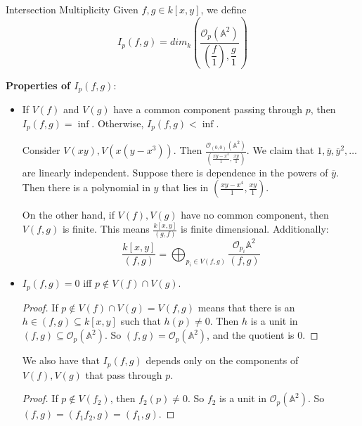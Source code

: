 \documentclass{report}
\begin{document}
\begin{definition}{Intersection Multiplicity}
    Given $f, g \in k[x, y]$, we define 
        \begin{equation*}
            I_{p}(f, g) = dim_{k}\left(\dfrac{\mathcal{O}_{p}(\mathbb{A}^{2})}{(\dfrac{f}{1}), \dfrac{g}{1}}\right)
        \end{equation*}
\end{definition}

\textbf{Properties of $I_{p}(f, g)$}:
    \begin{itemize}
        \item If $V(f)$ and $V(g)$ have a common component passing through $p$, then $I_{p}(f, g) = \inf$. Otherwise, $I_{p}(f, g) < \inf$.
            \begin{examples}
                \begin{example}
                    Consider $V(xy), V(x(y - x^{3}))$. Then $\frac{\mathcal{O}_{(0, 0)}(\mathbb{A}^{2})}{(\frac{xy - x^{4}}{1}, \frac{xy}{1})}$. We claim that $1, \overline{y}, \overline{y}^{2}, \ldots $ are linearly independent. Suppose there is dependence in the powers of $\overline{y}$. Then there is a polynomial in $y$ that lies in $(\frac{xy - x^{4}}{1}, \frac{xy}{1})$.

                    On the other hand, if $V(f), V(g)$ have no common component, then $V(f, g)$ is finite. This means $\frac{k[x, y]}{(g, f)}$ is finite dimensional. Additionally:
                        \begin{equation*}
                            \dfrac{k[x, y]}{(f, g)} = \bigoplus_{p_{i} \in V(f, g)} \dfrac{\mathcal{O}_{p_{i}}\mathbb{A}^{2}}{(f, g)}
                        \end{equation*}
                \end{example}
            \end{examples}

        \item $I_{p}(f, g) = 0$ iff $p \notin V(f) \cap V(g)$. 
            \begin{proof}
                If $p \notin V(f) \cap V(g) = V(f, g)$ means that there is an $h \in (f, g) \subseteq k[x, y]$ such that $h(p) \neq 0$. Then $h$ is a unit in $(f, g) \subseteq \mathcal{O}_{p}(\mathbb{A}^{2})$. So $(f, g) = \mathcal{O}_{p}(\mathbb{A}^{2})$, and the quotient is $0$.
            \end{proof}

            We also have that $I_{p}(f, g)$ depends only on the components of $V(f), V(g)$ that pass through $p$.
                \begin{proof}
                    If $p \notin V(f_{2})$, then $f_{2}(p) \neq 0$. So $f_{2}$ is a unit in $\mathcal{O}_{p}(\mathbb{A}^{2})$. So $(f, g) = (f_{1}f_{2}, g) = (f_{1}, g)$.
                \end{proof}


\end{itemize}
\end{document}

